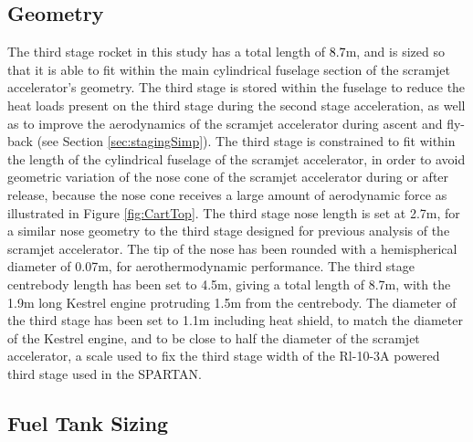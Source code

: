 \subsection{Geometry}\label{sec:3int}
The third stage rocket in this study has a total length of \textcolor{black}{8.7}m, and is sized so that it is able to fit within the main cylindrical fuselage section of the scramjet accelerator's geometry. The third stage is stored within the fuselage to reduce the heat loads present on the third stage during the second stage acceleration, as well as to improve the aerodynamics of the scramjet accelerator during ascent and fly-back (see Section \ref{sec:stagingSimp}). The third stage is constrained to fit within the length of the cylindrical fuselage of the scramjet accelerator, in order to avoid geometric variation of the nose cone of the scramjet accelerator during or after release, because the nose cone receives a large amount of aerodynamic force as illustrated in Figure \ref{fig:CartTop}.
 The third stage nose length is set at 2.7m, for a similar nose geometry to the third stage designed for previous analysis of the scramjet accelerator\cite{Preller2017b}. The tip of the nose has been rounded with a hemispherical diameter of 0.07m, for aerothermodynamic performance.
 The third stage centrebody length has been set to 4.5m, giving a total length of 8.7m, with the 1.9m long Kestrel engine\cite{Vehicle2008} protruding 1.5m from the centrebody. The diameter of the third stage has been set to 1.1m including heat shield, to match the diameter of the Kestrel engine, and to be close to half the diameter of the scramjet accelerator, a scale used to fix the third stage width of the Rl-10-3A powered third stage used in the SPARTAN\cite{Preller2017b}.  






	


\subsection{Fuel Tank Sizing}


